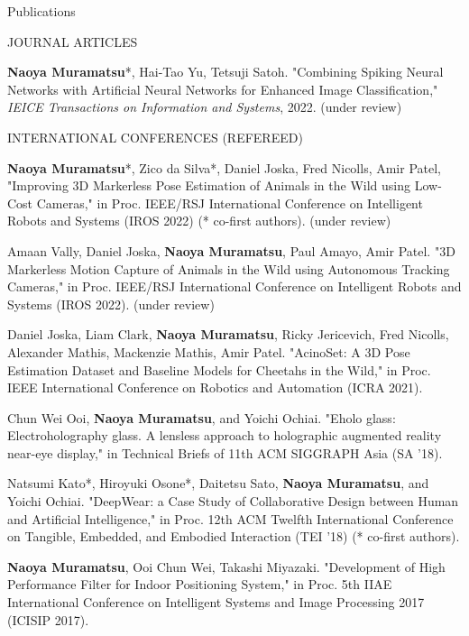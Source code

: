 \documentclass{resume} %
\begin{document}

\begin{rSection}{Publications} \itemsep 4pt


    \begin{rSubsection}{JOURNAL ARTICLES}{}{}{}{}
        \item \textbf{Naoya Muramatsu}*, Hai-Tao Yu, Tetsuji Satoh. "Combining Spiking Neural Networks with Artificial Neural Networks for Enhanced Image Classification," \textit{IEICE Transactions on Information and Systems}, 2022. (under review)
    \end{rSubsection}

    \begin{rSubsection}{INTERNATIONAL CONFERENCES (REFEREED)}{}{}{}{}
        \item \textbf{Naoya Muramatsu}*, Zico da Silva*, Daniel Joska, Fred Nicolls, Amir Patel, "Improving 3D Markerless Pose Estimation of Animals in the Wild using Low-Cost Cameras," in Proc. IEEE/RSJ International Conference on Intelligent Robots and Systems (IROS 2022) (* co-first authors). (under review)
        \item Amaan Vally, Daniel Joska, \textbf{Naoya Muramatsu}, Paul Amayo, Amir Patel. "3D Markerless Motion Capture of Animals in the Wild using Autonomous Tracking Cameras," in Proc. IEEE/RSJ International Conference on Intelligent Robots and Systems (IROS 2022). (under review)
        \item Daniel Joska, Liam Clark, \textbf{Naoya Muramatsu}, Ricky Jericevich, Fred Nicolls, Alexander Mathis, Mackenzie Mathis, Amir Patel. "AcinoSet: A 3D Pose Estimation Dataset and Baseline Models for Cheetahs in the Wild," in Proc. IEEE International Conference on Robotics and Automation (ICRA 2021).
        \item Chun Wei Ooi, \textbf{Naoya Muramatsu}, and Yoichi Ochiai. "Eholo glass: Electroholography glass. A lensless approach to holographic augmented reality near-eye display," in Technical Briefs of 11th ACM SIGGRAPH Asia (SA ’18).
        \item Natsumi Kato*, Hiroyuki Osone*, Daitetsu Sato, \textbf{Naoya Muramatsu}, and Yoichi Ochiai. "DeepWear: a Case Study of Collaborative Design between Human and Artificial Intelligence,"  in Proc. 12th ACM Twelfth International Conference on Tangible, Embedded, and Embodied Interaction (TEI ’18) (* co-first authors).
        \item \textbf{Naoya Muramatsu}, Ooi Chun Wei, Takashi Miyazaki. "Development of High Performance Filter for Indoor Positioning System," in Proc. 5th IIAE International Conference on Intelligent Systems and Image Processing 2017 (ICISIP 2017).
    \end{rSubsection}


\end{rSection}
\end{document}
